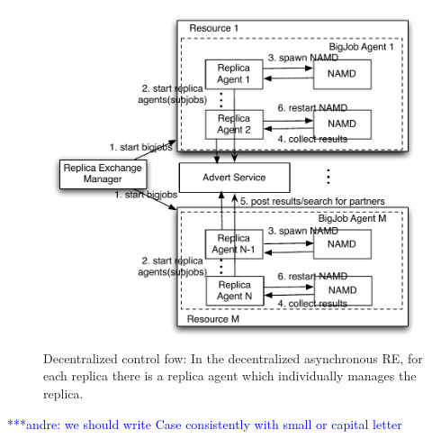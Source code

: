 \documentclass{rspublic}
\newcommand{\jhanote}[1]{ {\textcolor{red} { ***shantenu: #1 }}}
\newcommand{\alnote}[1]{ {\textcolor{blue} { ***andre: #1 }}}
\newcommand{\alnote}[1]{}
\newcommand{\jhanote}[1]{}
\begin{document}
\begin{figure}
\centering
\includegraphics[width=1\textwidth]{asyncre.pdf}
\caption{\small Decentralized control fow: In the decentralized asynchronous RE, for  each replica there is a replica agent which individually manages the replica.}
\label{fig:decent}
\end{figure}

\alnote{we should write Case consistently with small or capital letter}
\end{document}
